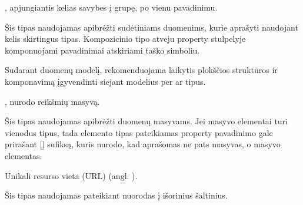\documentclass[letterpaper,10pt,lithuanian]{sphinxmanual}
\begin{document}

\begin{fulllineitems}
\label{\detokenize{tipai:type.object}}
\pysigstartsignatures
\pysigline
{}
\pysigstopsignatures
\sphinxAtStartPar
{\hyperref[\detokenize{savokos:term-sudetinis-tipas}]{}}, apjungiantis kelias savybes į
grupę, po vienu pavadinimu.

\sphinxAtStartPar
Šis tipas naudojamas apibrėžti sudėtiniams duomenims, kurie aprašyti
naudojant kelis skirtingus tipas. Kompozicinio tipo atveju property
stulpelyje komponuojami pavadinimai atskiriami taško simboliu.

\sphinxAtStartPar
Sudarant duomenų modelį, rekomenduojama laikytis plokščios struktūros ir
komponavimą įgyvendinti siejant modelius per  ar  tipus.

\end{fulllineitems}


\begin{fulllineitems}
\label{\detokenize{tipai:type.array}}
\pysigstartsignatures
\pysigline
{}
\pysigstopsignatures
\sphinxAtStartPar
{\hyperref[\detokenize{savokos:term-sudetinis-tipas}]{}}, nurodo reikšmių masyvą.

\sphinxAtStartPar
Šis tipas naudojamas apibrėžti duomenų masyvams. Jei masyvo elementai
turi vienodus tipus, tada elemento tipas pateikiamas property pavadinimo
gale prirašant {[}{]} sufiksą, kuris nurodo, kad aprašomas ne pats masyvas,
o masyvo elementas.

\end{fulllineitems}


\begin{fulllineitems}
\label{\detokenize{tipai:type.url}}
\pysigstartsignatures
\pysigline
{}
\pysigstopsignatures
\sphinxAtStartPar
Unikali resurso vieta (URL) (angl. ).

\sphinxAtStartPar
Šis tipas naudojamas pateikiant nuorodas į išorinius šaltinius.

\sphinxAtStartPar
{}

\end{fulllineitems}
\end{document}

